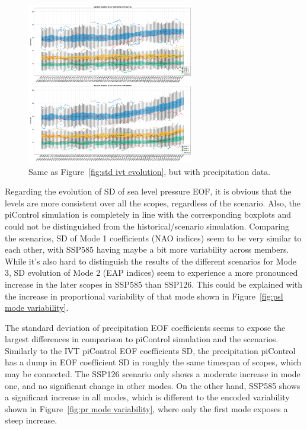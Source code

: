 \begin{figure}[htb]
  \begin{center}
    \includegraphics[width=0.65\textwidth]{figures/std_pr_50seasons_tempmodescale_3modes.png}
  \end{center}
  \caption{Same as Figure~\ref{fig:std ivt evolution}, but with precipitation data.}
  \label{fig:std pr evolution}
\end{figure}

Regarding the evolution of SD of sea level pressure EOF, it is obvious that the levels are more consistent over all the scopes, regardless of the scenario. 
Also, the piControl simulation is completely in line with the corresponding boxplots and could not be distinguished from the historical/scenario simulation. 
Comparing the scenarios, SD of Mode 1 coefficients (NAO indices) seem to be very similar to each other, with SSP585 having maybe a bit more variability across members. 
While it's also hard to distinguish the results of the different scenarios for Mode 3, SD evolution of Mode 2 (EAP indices) seem to experience a more pronounced increase in the later scopes in SSP585 than SSP126.  
This could be explained with the increase in proportional variability of that mode shown in Figure~\ref{fig:psl mode variability}.


The standard deviation of precipitation EOF coefficients seems to expose the largest differences in comparison to piControl simulation and the scenarios. 
Similarly to the IVT piControl EOF coefficients SD, the precipitation piControl has a dump in EOF coefficient SD in roughly the same timespan of scopes, which may be connected. 
The SSP126 scenario only shows a moderate increase in mode one, and no significant change in other modes. 
On the other hand, SSP585 shows a significant increase in all modes, which is different to the encoded variability shown in Figure~\ref{fig:pr mode variability}, where only the first mode exposes a steep increase. 



